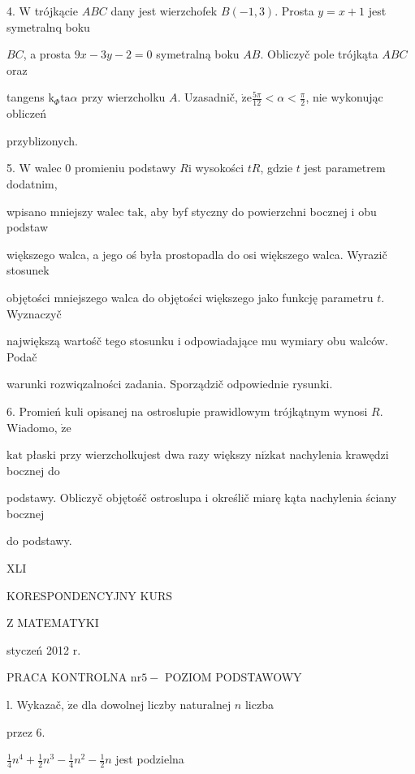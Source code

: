 \documentclass[a4paper,12pt]{article}
\begin{document}
4. $\mathrm{W}$ trójkącie $ABC$ dany jest wierzchofek $B(-1,3)$. Prosta $y=x+1$ jest symetralnq boku

$BC$, a prosta $9x-3y-2=0$ symetralną boku $AB$. Obliczyč pole trójkąta $ABC$ oraz

tangens $\mathrm{k}_{\Phi}\mathrm{t}\mathrm{a}\alpha$ przy wierzcholku $A$. Uzasadnič, $\displaystyle \dot{\mathrm{z}}\mathrm{e}\frac{5\pi}{12}<\alpha<\frac{\pi}{2}$, nie wykonując obliczeń

przyblizonych.

5. $\mathrm{W}$ walec $0$ promieniu podstawy $R\mathrm{i}$ wysokości $tR$, gdzie $t$ jest parametrem dodatnim,

wpisano mniejszy walec $\mathrm{t}\mathrm{a}\mathrm{k}$, aby byf styczny do powierzchni bocznej $\mathrm{i}$ obu podstaw

większego walca, a jego oś była prostopadla do osi większego walca. Wyrazič stosunek

objętości mniejszego walca do objętości większego jako funkcję parametru $t$. Wyznaczyč

największą wartośč tego stosunku $\mathrm{i}$ odpowiadające mu wymiary obu walców. Podač

warunki rozwiqzalności zadania. Sporządzič odpowiednie rysunki.

6. Promień kuli opisanej na ostroslupie prawidlowym trójkątnym wynosi $R$. Wiadomo, $\dot{\mathrm{z}}\mathrm{e}$

$\mathrm{k}\mathrm{a}\mathrm{t}$ płaski przy wierzcholkujest dwa razy większy $\mathrm{n}\mathrm{i}\dot{\mathrm{z}}\mathrm{k}\mathrm{a}\mathrm{t}$ nachylenia krawędzi bocznej do

podstawy. Obliczyč objętośč ostroslupa $\mathrm{i}$ określič miarę kąta nachylenia ściany bocznej

do podstawy.





XLI

KORESPONDENCYJNY KURS

Z MATEMATYKI

styczeń 2012 r.

PRACA KONTROLNA $\mathrm{n}\mathrm{r} 5-$ POZIOM PODSTAWOWY

l. Wykazač, $\dot{\mathrm{z}}\mathrm{e}$ dla dowolnej liczby naturalnej $n$ liczba

przez 6.

$\displaystyle \frac{1}{4}n^{4}+\frac{1}{2}n^{3}-\frac{1}{4}n^{2}-\frac{1}{2}n$ jest podzielna
\end{document}
